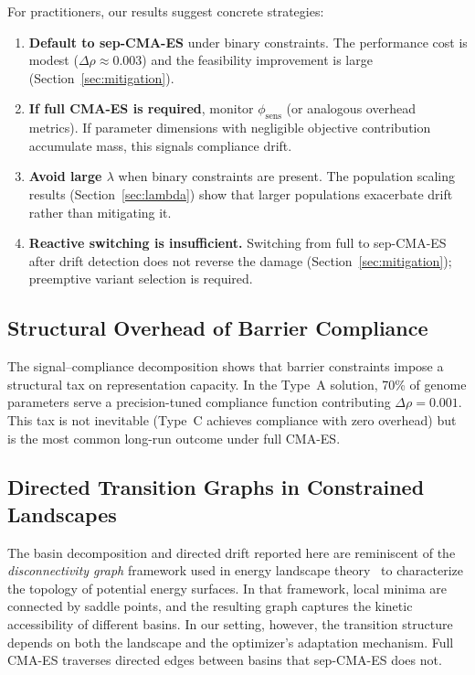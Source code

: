 \documentclass[twoside]{article}
\begin{document}
For practitioners, our results suggest concrete strategies:
\begin{enumerate}
\item \textbf{Default to sep-CMA-ES} under binary constraints. The performance
  cost is modest ($\Delta\rho \approx 0.003$) and the feasibility improvement is
  large (Section~\ref{sec:mitigation}).
\item \textbf{If full CMA-ES is required}, monitor $\phi_{\text{sens}}$ (or
  analogous overhead metrics). If parameter dimensions with negligible objective
  contribution accumulate mass, this signals compliance drift.
\item \textbf{Avoid large $\lambda$} when binary constraints are present.
  The population scaling results (Section~\ref{sec:lambda}) show that larger
  populations exacerbate drift rather than mitigating it.
\item \textbf{Reactive switching is insufficient.} Switching from full to
  sep-CMA-ES after drift detection does not reverse the damage
  (Section~\ref{sec:mitigation}); preemptive variant selection is required.
\end{enumerate}

\subsection{Structural Overhead of Barrier Compliance}

The signal--compliance decomposition shows that barrier constraints impose
a structural tax on representation capacity. In the Type~A solution, 70\% of
genome parameters serve a precision-tuned compliance function contributing
$\Delta\rho = 0.001$. This tax is not inevitable (Type~C achieves compliance
with zero overhead) but is the most common long-run outcome under full CMA-ES.

\subsection{Directed Transition Graphs in Constrained Landscapes}

The basin decomposition and directed drift reported here are
reminiscent of the \emph{disconnectivity graph} framework used in energy
landscape theory~\citep{wales2003energy,becker1997topology} to
characterize the topology of potential energy surfaces. In that
framework, local minima are connected by saddle points, and the
resulting graph captures the kinetic accessibility of different basins.
In our setting, however, the transition structure depends on both
the landscape and the optimizer's adaptation mechanism. Full CMA-ES traverses directed edges between
basins that sep-CMA-ES does not.
\end{document}
